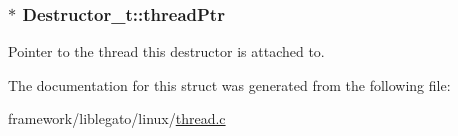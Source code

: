 \subsubsection[{\texorpdfstring{thread\+Ptr}{threadPtr}}]{$\ast$ Destructor\+\_\+t\+::thread\+Ptr}\hypertarget{struct_destructor__t_a805fb3ff162a9bedf2c9d9749edc362c}{}\label{struct_destructor__t_a805fb3ff162a9bedf2c9d9749edc362c}


Pointer to the thread this destructor is attached to. 



The documentation for this struct was generated from the following file\+:\begin{DoxyCompactItemize}
\item 
framework/liblegato/linux/\hyperlink{thread_8c}{thread.\+c}\end{DoxyCompactItemize}
